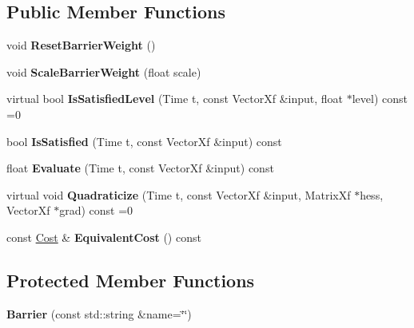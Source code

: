 \subsection*{Public Member Functions}
\begin{DoxyCompactItemize}
\item 
void {\bfseries Reset\+Barrier\+Weight} ()\hypertarget{classilqgames_1_1_barrier_a94616685299cf789d0e5d629dcd5c631}{}\label{classilqgames_1_1_barrier_a94616685299cf789d0e5d629dcd5c631}

\item 
void {\bfseries Scale\+Barrier\+Weight} (float scale)\hypertarget{classilqgames_1_1_barrier_aca41c04715cbabc3bbb0ecda5ae09d33}{}\label{classilqgames_1_1_barrier_aca41c04715cbabc3bbb0ecda5ae09d33}

\item 
virtual bool {\bfseries Is\+Satisfied\+Level} (Time t, const Vector\+Xf \&input, float $\ast$level) const =0\hypertarget{classilqgames_1_1_barrier_ad8fc760e7599898105f556b797df3211}{}\label{classilqgames_1_1_barrier_ad8fc760e7599898105f556b797df3211}

\item 
bool {\bfseries Is\+Satisfied} (Time t, const Vector\+Xf \&input) const \hypertarget{classilqgames_1_1_barrier_ad7211c549a297c04ce1c84fcc280d2bc}{}\label{classilqgames_1_1_barrier_ad7211c549a297c04ce1c84fcc280d2bc}

\item 
float {\bfseries Evaluate} (Time t, const Vector\+Xf \&input) const \hypertarget{classilqgames_1_1_barrier_a1571674cc519152604a748e6a45c68b3}{}\label{classilqgames_1_1_barrier_a1571674cc519152604a748e6a45c68b3}

\item 
virtual void {\bfseries Quadraticize} (Time t, const Vector\+Xf \&input, Matrix\+Xf $\ast$hess, Vector\+Xf $\ast$grad) const =0\hypertarget{classilqgames_1_1_barrier_af0907f5652ff518d2fbfceaf4db74bae}{}\label{classilqgames_1_1_barrier_af0907f5652ff518d2fbfceaf4db74bae}

\item 
const \hyperlink{classilqgames_1_1_cost}{Cost} \& {\bfseries Equivalent\+Cost} () const \hypertarget{classilqgames_1_1_barrier_ac04a34828457ff83730fe33c53120f18}{}\label{classilqgames_1_1_barrier_ac04a34828457ff83730fe33c53120f18}

\end{DoxyCompactItemize}
\subsection*{Protected Member Functions}
\begin{DoxyCompactItemize}
\item 
{\bfseries Barrier} (const std\+::string \&name=\char`\"{}\char`\"{})\hypertarget{classilqgames_1_1_barrier_ad8e0b033a2f8321a21bec1ac0466905f}{}\label{classilqgames_1_1_barrier_ad8e0b033a2f8321a21bec1ac0466905f}

\end{DoxyCompactItemize}

